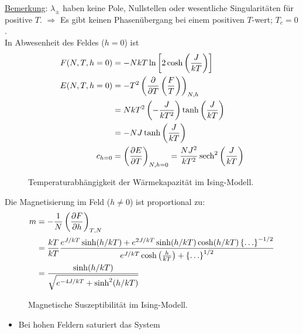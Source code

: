 \begin{enumerate}[A)]
    \underline{Bemerkung}: $\lambda_\pm$ haben keine Pole, Nullstellen oder wesentliche Singularitäten für positive $T$.
    $\Rightarrow$ Es gibt keinen Phasenübergang bei einem positiven $T$-wert; $T_c = 0$. \\
    In Abwesenheit des Feldes ($h=0$) ist
    \begin{equation}
        \begin{split}
            F(N, T, h=0) &= - N k T \ln \left[ 2 \cosh \left( \frac{J}{k T} \right) \right] \\
            E(N, T, h=0) &= - T^2 \left( \frac{\partial}{\partial T} \left( \frac{F}{T} \right)  \right)_{N, h} \\
            &= N k T^2 \left( - \frac{J}{k T^2} \right) \tanh \left( \frac{J}{k T} \right)  \\
            &= - N J \tanh \left( \frac{J}{k T} \right) \\
            c_{h=0} &= \left( \frac{\partial E}{\partial T} \right)_{N, h=0} = \frac{N J^2}{k T^2} \operatorname{sech}^2 \left( \frac{J}{k T} \right)
        \end{split}
    \end{equation}
    \begin{figure}[H]
        \centering
        \def\svgwidth{0.5\textwidth}
        
        \caption{Temperaturabhängigkeit der Wärmekapazität im Ising-Modell.}
        \label{img:IsingC_T}
    \end{figure}
    Die Magnetisierung im Feld ($h \neq 0$) ist proportional zu:
    \begin{equation}
        \begin{split}
            m &= - \frac{1}{N} \left( \frac{\partial F}{\partial h} \right)_{T, N} \\
            &= \frac{k T}{k T} \frac{e^{J/kT} \sinh(h/kT) +e^{2J/kT} \sinh (h/kT) \cosh (h/kT) \left\{ \ldots \right\}^{-1/2}}{e^{J / k T} \cosh \left( \frac{h}{k T} \right) + \left\{ \ldots \right\}^{1/2}} \\
            &= \frac{\sinh (h / k T)}{\sqrt{e^{-4 J / k T} + \sinh^2 (h/k T)}}
        \end{split}
    \end{equation}
    \begin{figure}[H]
        \centering
        \def\svgwidth{0.6\textwidth}
        
        \caption{Magnetische Suszeptibilität im Ising-Modell.}
        \label{img:Isingm_T}
    \end{figure}
    \begin{itemize}
        \item Bei hohen Feldern saturiert das System

\end{itemize}
\end{enumerate}

